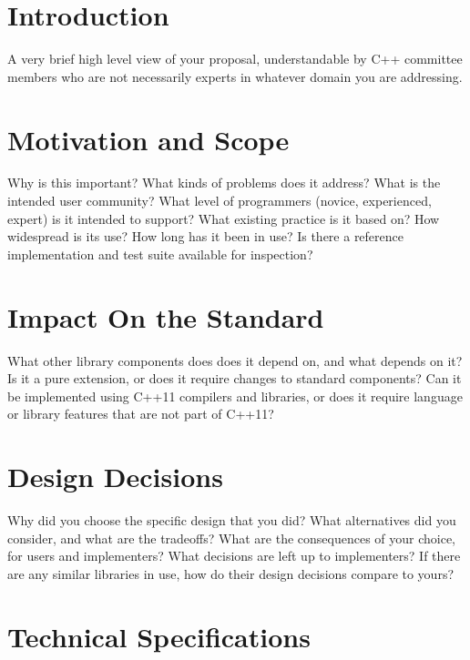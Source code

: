 \documentclass{isocpp_proposal}
\date{\today}
\begin{document}
\maketitle

\section{Introduction}

A very brief high level view of your proposal, understandable by C++ committee members who are not necessarily experts in whatever domain you are addressing.

\section{Motivation and Scope}

Why is this important? What kinds of problems does it address? What is the intended user community? What level of programmers (novice, experienced, expert) is it intended to support? What existing practice is it based on? How widespread is its use? How long has it been in use? Is there a reference implementation and test suite available for inspection?

\section{Impact On the Standard}

What other library components does does it depend on, and what depends on it? Is it a pure extension, or does it require changes to standard components? Can it be implemented using C++11 compilers and libraries, or does it require language or library features that are not part of C++11?

\section{Design Decisions}

Why did you choose the specific design that you did? What alternatives did you consider, and what are the tradeoffs? What are the consequences of your choice, for users and implementers? What decisions are left up to implementers? If there are any similar libraries in use, how do their design decisions compare to yours?

\section{Technical Specifications}
\end{document}
